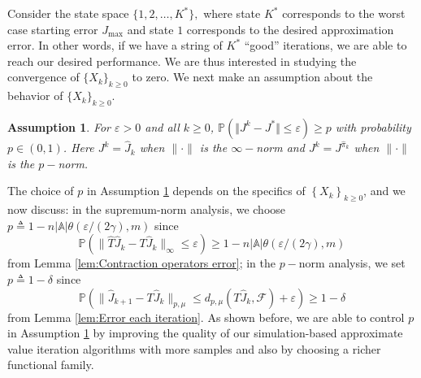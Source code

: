 \documentclass[12pt,technote,onecolumn]{IEEEtran}
\newtheorem{assumption}{Assumption}
\begin{document}
Consider the state space
$
\{ 1,2,\ldots,K^{*}\} ,
$
where state $K^{*}$ corresponds to the worst case starting error
$J_{\max}$ and state $1$ corresponds to the desired approximation
error. In other words, if we have a string of $K^{*}$ ``good'' iterations,
we are able to reach our desired performance. We are thus interested
in studying the convergence of $\{ X_{k}\} _{k\geq0}$
to zero. We next make an assumption about the behavior of $\{ X_{k}\} _{k\geq0}$.
\begin{assumption}
	\label{assu:Probability} For $\varepsilon>0$ and all $k\geq0$,
	$\mathbb{P}(\Vert J^{k}-J^{*}\Vert \leq\varepsilon)\geq p$
	with probability $p\in(0,1)$. Here $J^{k}=\widehat{J}_{k}$
	when $\|\cdot\|$ is the $\infty-$norm and $J^{k}=J^{\widehat{\pi}_{k}}$
	when $\|\cdot\|$ is the $p-$norm. 
\end{assumption}

The choice of $p$ in Assumption \ref{assu:Probability} depends on
the specifics of $\left\{ X_{k}\right\} _{k\geq0}$, and we now discuss:
in the supremum-norm analysis, we choose $p\triangleq1-n|\mathbb{A}|\theta({\varepsilon}/{(2\gamma)},m)$
since 
$$
\mathbb{P}(\|\widehat{T}\widehat{J}_{k}-T\widehat{J}_{k}\|_{\infty}\leq\varepsilon)\geq1-n\left|\mathbb{A}\right|\theta({\varepsilon}/{(2\gamma)},m)
$$
from Lemma \ref{lem:Contraction operators error}; in the $p-$norm
analysis, we set $p\triangleq1-\delta$ since 
$$
\mathbb{P}(\|\widehat{J}_{k+1}-T\widehat{J}_{k}\|_{p,\mu}\leq d_{p,\mu}(T\widehat{J}_{k},\mathcal{F})+\varepsilon)\geq1-\delta
$$
from Lemma \ref{lem:Error each iteration}. As shown before, we are
able to control $p$ in Assumption \ref{assu:Probability} by improving
the quality of our simulation-based approximate value iteration algorithms
with more samples and also by choosing a richer functional family.
\end{document}
